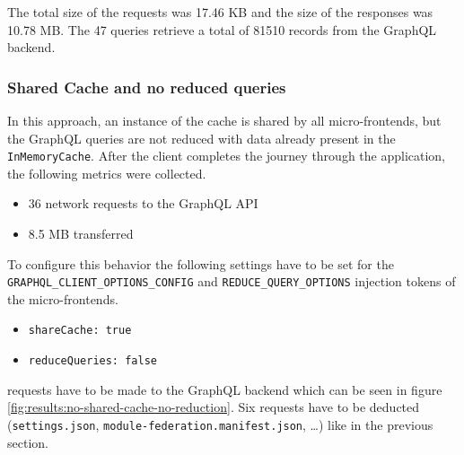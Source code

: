 \noindent The total size of the requests was 17.46 KB and the size of the responses was 10.78 MB. The 47 queries retrieve a total of 81510 records from the GraphQL backend.

\subsubsection{Shared Cache and no reduced queries}\label{subsubsection:results:performance-measurement:shared-cache-no-reduction}

In this approach, an instance of the cache is shared by all micro-frontends, but the GraphQL queries are not reduced with data already present in the \texttt{InMemoryCache}. After the client completes the journey through the application, the following metrics were collected.

\begin{itemize}
  \item 36 network requests to the GraphQL \ac{API}
  \item 8.5 MB transferred
\end{itemize}

\noindent To configure this behavior the following settings have to be set for the \texttt{GRAPHQL\_CLIENT\_OPTIONS\_CONFIG} and \texttt{REDUCE\_QUERY\_OPTIONS} injection tokens of the micro-frontends.

\begin{itemize}
  \item \texttt{shareCache: true}
  \item \texttt{reduceQueries: false}
\end{itemize}

 requests have to be made to the GraphQL backend which can be seen in figure \ref{fig:results:no-shared-cache-no-reduction}. Six requests have to be deducted (\texttt{settings.json}, \texttt{module-federation.manifest.json}, \dots) like in the previous section.

